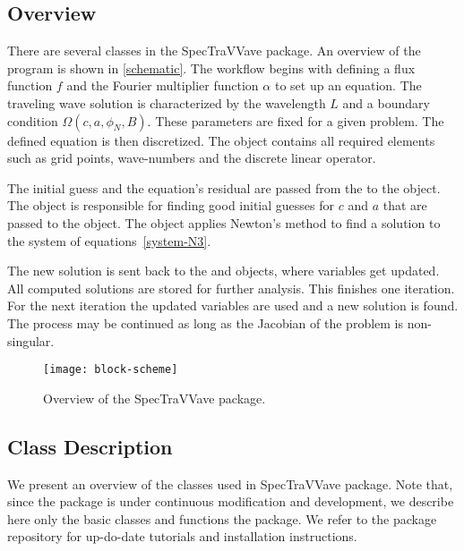 \subsection{Overview}
There are several classes in the \textsf{SpecTraVVave} package. An overview of the program is shown 
in \autoref{schematic}. The workflow begins with defining a flux function $f$ and the Fourier multiplier function $\alpha$ to set up an equation. 
The traveling wave solution is characterized by the wavelength $L$ 
and a boundary condition $\Omega(c, a, \phi_N, B)$. These parameters are fixed for a given problem.
The defined equation is then discretized. 
The  object contains all required elements such as grid points, wave-numbers and the  discrete linear operator.
		
The initial guess and the equation's residual are passed from the  to the  object. 
The  object is responsible for finding good initial guesses for $c$ and $a$ that are  
passed to the  object. 
The  object applies Newton's method to find a solution to the system of equations~\eqref{system-N3}. 
	
The new solution is sent back to the   and  objects, where variables get updated.
All computed solutions are stored for further analysis. 
This finishes one iteration. 
For the next iteration the updated variables are used and a new solution is found. 
The process may be continued as long as the Jacobian of the problem is non-singular. 
 
\begin{figure}[ht]
	\centering
\texttt{[image: block-scheme]} 
\caption{\small Overview of the \textsf{SpecTraVVave} package.}     
\label{schematic}
\end{figure} 


 \subsection{Class Description}
 
 
We present an overview of the classes used in \textsf{SpecTraVVave} package. Note that, since the package is under continuous modification and development, we describe here only the  basic classes and functions the package. 
We refer to the package repository \cite{github} for up-do-date tutorials and installation instructions.
 
